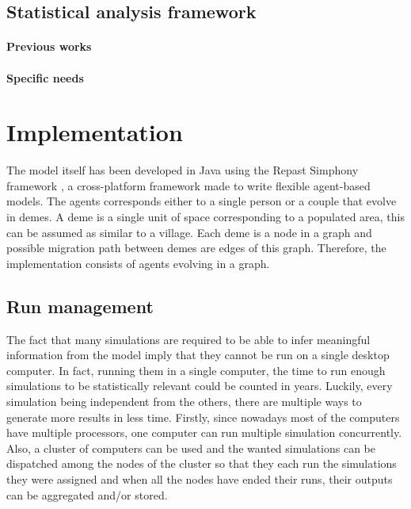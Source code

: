 \documentclass[a4paper,12pt]{report}
\begin{document}
\section{Statistical analysis framework}
\subsubsection{Previous works}
\subsubsection{Specific needs}


\chapter{Implementation}
The model itself has been developed in Java using the Repast Simphony framework \cite{Nor01}, a cross-platform framework made to write flexible agent-based models. The agents corresponds either to a single person or a couple that evolve in demes. A deme is a single unit of space corresponding to a populated area, this can be assumed as similar to a village. Each deme is a node in a graph and possible migration path between demes are edges of this graph. Therefore, the implementation consists of agents evolving in a graph.

\section{Run management}
The fact that many simulations are required to be able to infer meaningful information from the model imply that they cannot be run on a single desktop computer. In fact, running them in a single computer, the time to run enough simulations to be statistically relevant could be counted in years.
Luckily, every simulation being independent from the others, there are multiple ways to generate more results in less time.
Firstly, since nowadays most of the computers have multiple processors, one computer can run multiple simulation concurrently. Also, a cluster of computers can be used and the wanted simulations can be dispatched among the nodes of the cluster so that they each run the simulations they were assigned and when all the nodes have ended their runs, their outputs can be aggregated and/or stored.
\end{document}
